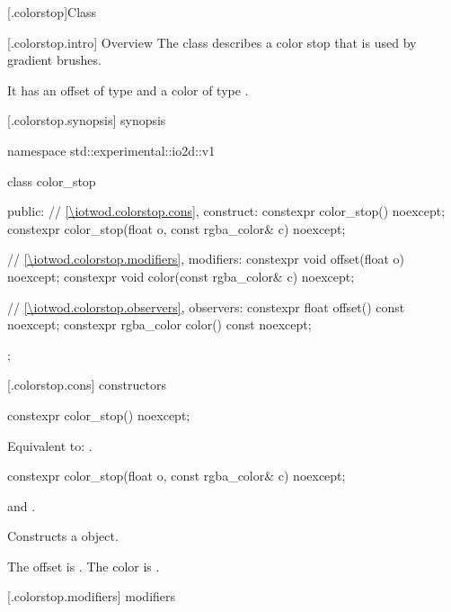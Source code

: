  [\iotwod.colorstop]{Class }

 [\iotwod.colorstop.intro] {Overview}
\pnum
{}%
The class  describes a color stop that is used by gradient brushes.

\pnum
It has an offset of type  and a color of type .

 [\iotwod.colorstop.synopsis] { synopsis}

\begin{codeblock}
namespace std::experimental::io2d::v1 {
  class color_stop {
  public:
  	// \ref{\iotwod.colorstop.cons}, construct:
  	constexpr color_stop() noexcept;
    constexpr color_stop(float o, const rgba_color& c) noexcept;
    
    // \ref{\iotwod.colorstop.modifiers}, modifiers:
    constexpr void offset(float o) noexcept;
	constexpr void color(const rgba_color& c) noexcept;
	
    // \ref{\iotwod.colorstop.observers}, observers:
	constexpr float offset() const noexcept;
	constexpr rgba_color color() const noexcept;
  };
}
\end{codeblock}

 [\iotwod.colorstop.cons]{ constructors}

%
\begin{itemdecl}
constexpr color_stop() noexcept;
\end{itemdecl}
\begin{itemdescr}
\pnum
\effects
Equivalent to: .
\end{itemdescr}

%
\begin{itemdecl}
constexpr color_stop(float o, const rgba_color& c) noexcept;
\end{itemdecl}
\begin{itemdescr}
\pnum
\requires
{} and .

\pnum
\effects
Constructs a  object.

\pnum
The offset is . The color is .
\end{itemdescr}

 [\iotwod.colorstop.modifiers]{ modifiers}

